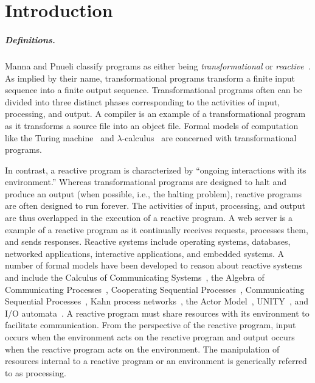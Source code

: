 \chapter{Introduction}
\label{introduction}

\paragraph{Definitions.}
Manna and Pnueli classify programs as either being \emph{transformational} or \emph{reactive}~\cite{manna1992temporal}.
As implied by their name, transformational programs transform a finite input sequence into a finite output sequence.
Transformational programs often can be divided into three distinct phases corresponding to the activities of input, processing, and output.
A compiler is an example of a transformational program as it transforms a source file into an object file.
Formal models of computation like the Turing machine~\cite{turing1936computable} and $\lambda$-calculus~\cite{church1936unsolvable} are concerned with transformational programs.

In contrast, a reactive program is characterized by ``ongoing interactions with its environment\cite{manna1992temporal}.''
Whereas transformational programs are designed to halt and produce an output (when possible, i.e., the halting problem), reactive programs are often designed to run forever.
The activities of input, processing, and output are thus overlapped in the execution of a reactive program.
A web server is a example of a reactive program as it continually receives requests, processes them, and sends responses.
Reactive systems include operating systems, databases, networked applications, interactive applications, and embedded systems.
A number of formal models have been developed to reason about reactive systems and include the Calculus of Communicating Systems~\cite{milner1982calculus}, the Algebra of Communicating Processes~\cite{bergstra1982fixed}, Cooperating Sequential Processes~\cite{dijkstra1965cooperating}, Communicating Sequential Processes~\cite{hoare1978communicating}, Kahn process networks~\cite{kahn1974semantics}, the Actor Model~\cite{hewitt1973universal}\cite{clinger1981foundations}\cite{agha1985actors}, UNITY~\cite{chandy1989parallel}, and I/O automata~\cite{nancy1996distributed}.
A reactive program must share resources with its environment to facilitate communication.
From the perspective of the reactive program, input occurs when the environment acts on the reactive program and output occurs when the reactive program acts on the environment.
The manipulation of resources internal to a reactive program or an environment is generically referred to as processing.


